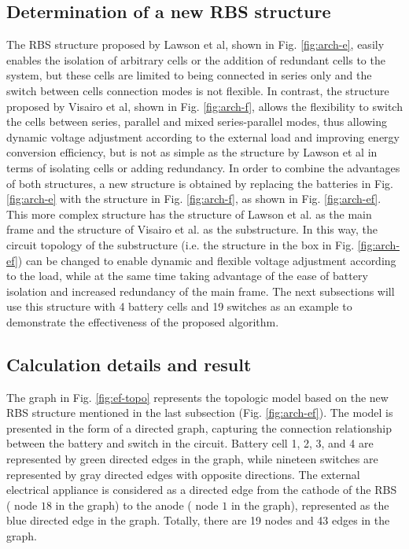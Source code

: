\documentclass{article}
\begin{document}
\subsection{Determination of a new RBS structure}


The RBS structure proposed by Lawson et al\cite{lawsonSoftwareConfigurableBattery2012}, shown in Fig. \ref{fig:arch-e}, easily enables the isolation of arbitrary cells or the addition of redundant cells to the system, but these cells are limited to being connected in series only and the switch between cells connection modes is not flexible. 
In contrast, the structure proposed by Visairo et al\cite{visairoReconfigurableBatteryPack2008}, shown in Fig. \ref{fig:arch-f}, allows the flexibility to switch the cells between series, parallel and mixed series-parallel modes, thus allowing dynamic voltage adjustment according to the external load and improving energy conversion efficiency, but is not as simple as the structure by Lawson et al in terms of isolating cells or adding redundancy.
In order to combine the advantages of both structures, a new structure is obtained by replacing the batteries in Fig. \ref{fig:arch-e} with the structure in Fig. \ref{fig:arch-f}, as shown in Fig. \ref{fig:arch-ef}.
This more complex structure has the structure of Lawson et al.\cite{lawsonSoftwareConfigurableBattery2012} as the main frame and the structure of Visairo et al.\cite{visairoReconfigurableBatteryPack2008} as the substructure.
In this way, the circuit topology of the substructure (i.e. the structure in the box in Fig. \ref{fig:arch-ef}) can be changed to enable dynamic and flexible voltage adjustment according to the load, while at the same time taking advantage of the ease of battery isolation and increased redundancy of the main frame.
The next subsections will use this structure with 4 battery cells and 19 switches as an example to demonstrate the effectiveness of the proposed algorithm.

\subsection{Calculation details and result}


The graph in Fig. \ref{fig:ef-topo} represents the topologic model based on the new RBS structure mentioned in the last subsection (Fig. \ref{fig:arch-ef}).
The model is presented in the form of a directed graph, capturing the connection relationship between the battery and switch in the circuit.
Battery cell 1, 2, 3, and 4 are represented by green directed edges in the graph, while nineteen switches are represented by gray directed edges with opposite directions.
The external electrical appliance is considered as a directed edge from the cathode of the RBS ( node $18$ in the graph) to the anode ( node $1$ in the graph), represented as the blue directed edge in the graph.
Totally, there are 19 nodes and 43 edges in the graph.
\end{document}
